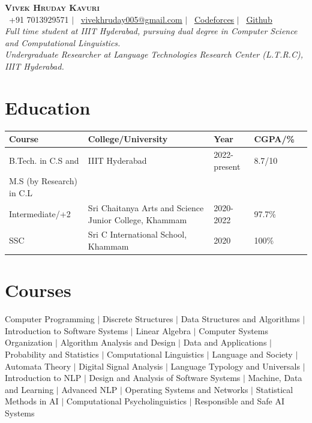 \documentclass[letterpaper,11pt]{article}
\begin{document}
\begin{center}
    \textbf{\Huge \scshape Vivek Hruday Kavuri} \\ \vspace{1pt}
    \small \faPhone\  +91 7013929571 $|$ \faEnvelopeO\ \href{mailto:vivekhruday005@gmail.com}{\underline{vivekhruday005@gmail.com}} $|$ \faCode\ \href{https://codeforces.com/profile/vivekhruday05}{\underline{Codeforces}} $|$ \faGithub\ \href{https://github.com/vivekhruday05}{\underline{Github}}\\
    \textit{\small{Full time student at IIIT Hyderabad, pursuing dual degree in Computer Science and Computational Linguistics. \\ Undergraduate Researcher at Language Technologies Research Center (L.T.R.C), IIIT Hyderabad.}}

\end{center}


\section{Education}
  \setlength{\tabcolsep}{3pt}
\begin{tabular}{lllll}
\textbf{Course} & \textbf{College/University} & \textbf{Year} & \textbf{CGPA/\%} \\ 
\midrule
B.Tech. in C.S and   & IIIT Hyderabad  &  2022-present & 8.7/10\\ M.S (by Research) in C.L\\
Intermediate/+2      & Sri Chaitanya Arts and Science Junior College, Khammam  & 2020-2022 & 97.7\%  \\ 
SSC     & Sri C International School, Khammam & 2020 & 100\%  \\ 
\bottomrule
\end{tabular}

\section{Courses}
\small{ Computer Programming $|$ Discrete Structures $|$ Data Structures and Algorithms $|$ Introduction to Software Systems $|$ Linear Algebra $|$ Computer Systems Organization $|$ Algorithm Analysis and Design $|$ Data and Applications $|$ Probability and Statistics $|$ Computational Linguistics $|$ Language and Society $|$ Automata Theory $|$ Digital Signal Analysis $|$ Language Typology and Universals $|$ Introduction to NLP $|$ Design and Analysis of Software Systems $|$ Machine, Data and Learning $|$ Advanced NLP $|$ Operating Systems and Networks $|$ Statistical Methods in AI $|$ Computational Psycholinguistics $|$ Responsible and Safe AI Systems}
\end{document}
